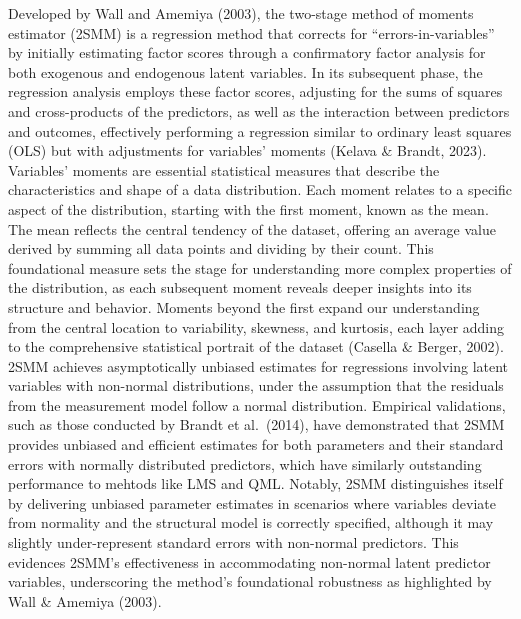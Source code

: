 \documentclass[
  man]{apa7}
\begin{document}
Developed by Wall and Amemiya (2003), the two-stage method of moments estimator (2SMM) is a regression method that corrects for ``errors-in-variables'' by initially estimating factor scores through a confirmatory factor analysis for both exogenous and endogenous latent variables. In its subsequent phase, the regression analysis employs these factor scores, adjusting for the sums of squares and cross-products of the predictors, as well as the interaction between predictors and outcomes, effectively performing a regression similar to ordinary least squares (OLS) but with adjustments for variables' moments (Kelava \& Brandt, 2023). Variables' moments are essential statistical measures that describe the characteristics and shape of a data distribution. Each moment relates to a specific aspect of the distribution, starting with the first moment, known as the mean. The mean reflects the central tendency of the dataset, offering an average value derived by summing all data points and dividing by their count. This foundational measure sets the stage for understanding more complex properties of the distribution, as each subsequent moment reveals deeper insights into its structure and behavior. Moments beyond the first expand our understanding from the central location to variability, skewness, and kurtosis, each layer adding to the comprehensive statistical portrait of the dataset (Casella \& Berger, 2002). 2SMM achieves asymptotically unbiased estimates for regressions involving latent variables with non-normal distributions, under the assumption that the residuals from the measurement model follow a normal distribution. Empirical validations, such as those conducted by Brandt et al.~(2014), have demonstrated that 2SMM provides unbiased and efficient estimates for both parameters and their standard errors with normally distributed predictors, which have similarly outstanding performance to mehtods like LMS and QML. Notably, 2SMM distinguishes itself by delivering unbiased parameter estimates in scenarios where variables deviate from normality and the structural model is correctly specified, although it may slightly under-represent standard errors with non-normal predictors. This evidences 2SMM's effectiveness in accommodating non-normal latent predictor variables, underscoring the method's foundational robustness as highlighted by Wall \& Amemiya (2003).
\end{document}
